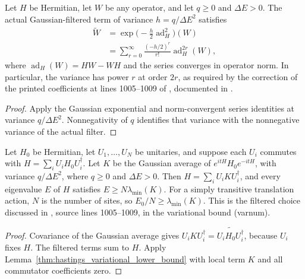 \begin{lemma}
    \label{lem:hastings_gaussian_commutator_series}
    \leanok
    Let $H$ be Hermitian, let $W$ be any operator, and let $q\ge0$ and
    $\Delta E>0$. The actual Gaussian-filtered term of variance
    $h=q/\Delta E^2$ satisfies
    \begin{align}
        \widetilde W
         & =\exp\bigl(-\tfrac h2\operatorname{ad}_H^2\bigr)(W) \\
         & =\sum_{r=0}^{\infty}\frac{(-h/2)^r}{r!}
        \operatorname{ad}_H^{2r}(W),
    \end{align}
    where $\operatorname{ad}_H(W)=HW-WH$ and the series converges in
    operator norm. In particular, the variance has power $r$ at order
    $2r$, as required by the correction of the printed coefficients at
    lines 1005--1009 of \cite{Hastings2006Solving}, documented in
    \cite{gap:hastings05_gaussian_series_coefficients}.
\end{lemma}
\begin{proof}
    \leanok
    Apply the Gaussian exponential and norm-convergent series identities
    at variance $q/\Delta E^2$. Nonnegativity of $q$ identifies that
    variance with the nonnegative variance of the actual filter.
\end{proof}

\begin{lemma}
    \label{thm:hastings_gaussian_variational_lower_bound}
    \leanok
    Let $H_0$ be Hermitian, let $U_1,\ldots,U_N$ be unitaries, and suppose
    each $U_i$ commutes with $H=\sum_i U_iH_0U_i^\dagger$.
    Let $K$ be the Gaussian average of $e^{itH}H_0e^{-itH}$, with variance
    $q/\Delta E^2$, where $q\ge0$ and $\Delta E>0$. Then
    $H=\sum_iU_iKU_i^\dagger$, and every eigenvalue $E$ of $H$ satisfies
    $E\ge N\lambda_{\min}(K)$. For a simply transitive translation action,
    $N$ is the number of sites, so $E_0/N\ge\lambda_{\min}(K)$.
    This is the filtered choice discussed in \cite{Hastings2006Solving},
    source lines 1005--1009, in the variational bound (varnum).
\end{lemma}
\begin{proof}\leanok
    Covariance of the Gaussian average gives
    $U_iKU_i^\dagger=\widetilde{U_iH_0U_i^\dagger}$, because $U_i$ fixes $H$.
    The filtered terms sum to $H$. Apply
    Lemma~\ref{thm:hastings_variational_lower_bound} with local term $K$
    and all commutator coefficients zero.
\end{proof}
